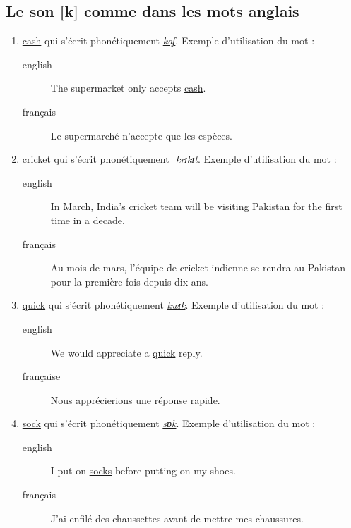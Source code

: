 \documentclass[12pt,a4paper]{book}
\begin{document}
\subsection{Le son [k] comme dans les mots anglais}
\label{sec:org5ed979e}
\begin{enumerate}
\item \href{http://www.wordreference.com/enfr/cash}{cash} qui s'écrit phonétiquement \href{https://en.oxforddictionaries.com/definition/cash}{\emph{kaʃ}}. Exemple d'utilisation du mot :
\begin{description}
\item[{english}] \textenglish{The supermarket only accepts \href{https://youtu.be/ALGi0tcFCcw}{cash}.}
\item[{français}] Le supermarché n'accepte que les espèces.
\end{description}
\item \href{http://www.wordreference.com/enfr/cricket}{cricket} qui s'écrit phonétiquement \href{https://en.oxforddictionaries.com/definition/cricket}{\emph{ˈkrɪkɪt}}. Exemple d'utilisation du mot :
\begin{description}
\item[{english}] \textenglish{In March, India's \href{https://youtu.be/c5oZPB-grGI}{cricket} team will be visiting
Pakistan for the first time in a decade.}
\item[{français}] Au mois de mars, l'équipe de cricket indienne se rendra au Pakistan pour la première fois depuis dix ans.
\end{description}
\item \href{http://www.wordreference.com/enfr/quick}{quick} qui s'écrit phonétiquement \href{https://en.oxforddictionaries.com/definition/quick}{\emph{kwɪk}}. Exemple d'utilisation du mot :
\begin{description}
\item[{english}] \textenglish{We would appreciate a \href{https://youtu.be/OB-YD47ddWI}{quick} reply.}
\item[{française}] Nous apprécierions une réponse rapide.
\end{description}
\item \href{http://www.wordreference.com/enfr/sock}{sock} qui s'écrit phonétiquement \href{https://en.oxforddictionaries.com/definition/sock}{\emph{sɒk}}. Exemple d'utilisation du mot :
\begin{description}
\item[{english}] \textenglish{I put on \href{https://youtu.be/Eu1fW2BafnM}{socks} before putting on my shoes.}
\item[{français}] J'ai enfilé des chaussettes avant de mettre mes
chaussures.
\end{description}
\end{enumerate}
\end{document}
